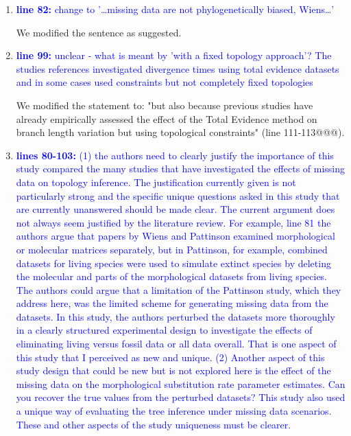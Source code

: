 \documentclass[12pt,letterpaper]{article}
\begin{document}
\begin{enumerate}
\item{\textcolor{blue}{\textbf{line 82:} change to '…missing data are not phylogenetically biased, Wiens…'}}

We modified the sentence as suggested.

\item{\textcolor{blue}{\textbf{line 99:} unclear - what is meant by 'with a fixed topology approach'? The studies references investigated divergence times using total evidence datasets and in some cases used constraints but not completely fixed topologies}}

We modified the statement to: "but also because previous studies have already empirically assessed the effect of the Total Evidence method on branch length variation but using topological constraints" (line 111-113@@@).

\item{\textcolor{blue}{\textbf{lines 80-103:} (1) the authors need to clearly justify the importance of this study compared the many studies that have investigated the effects of missing data on topology inference.
The justification currently given is not particularly strong and the specific unique questions asked in this study that are currently unanswered should be made clear.
The current argument does not always seem justified by the literature review.
For example, line 81 the authors argue that papers by Wiens and Pattinson examined morphological or molecular matrices separately, but in Pattinson, for example, combined datasets for living species were used to simulate extinct species by deleting the molecular and parts of the morphological datasets from living species.
The authors could argue that a limitation of the Pattinson study, which they address here, was the limited scheme for generating missing data from the datasets.
In this study, the authors perturbed the datasets more thoroughly in a clearly structured experimental design to investigate the effects of eliminating living versus fossil data or all data overall.
That is one aspect of this study that I perceived as new and unique.
(2) Another aspect of this study design that could be new but is not explored here is the effect of the missing data on the morphological substitution rate parameter estimates.
Can you recover the true values from the perturbed datasets?
This study also used a unique way of evaluating the tree inference under missing data scenarios.
These and other aspects of the study uniqueness must be clearer.}}


\end{enumerate}
\end{document}
